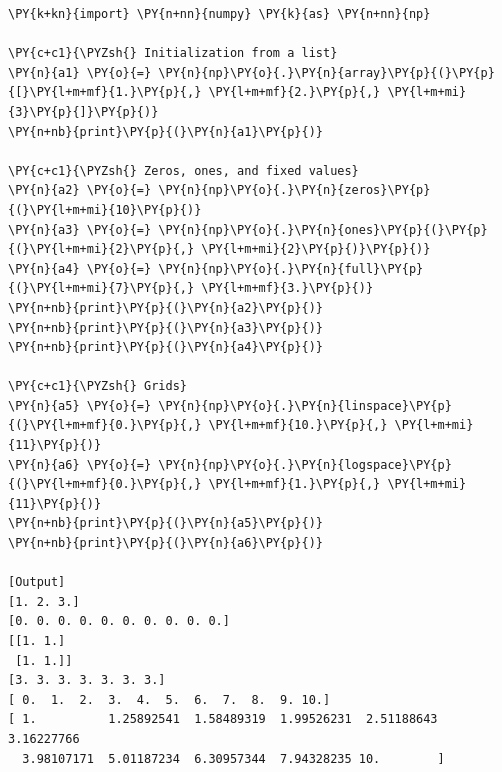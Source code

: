 \begin{Verbatim}[label=\makebox{\url{https://github.com/lucabaldini/cmepda/tree/master/slides/latex/snippets/numpy\_arrays.py}},commandchars=\\\{\}]
\PY{k+kn}{import} \PY{n+nn}{numpy} \PY{k}{as} \PY{n+nn}{np}

\PY{c+c1}{\PYZsh{} Initialization from a list}
\PY{n}{a1} \PY{o}{=} \PY{n}{np}\PY{o}{.}\PY{n}{array}\PY{p}{(}\PY{p}{[}\PY{l+m+mf}{1.}\PY{p}{,} \PY{l+m+mf}{2.}\PY{p}{,} \PY{l+m+mi}{3}\PY{p}{]}\PY{p}{)}
\PY{n+nb}{print}\PY{p}{(}\PY{n}{a1}\PY{p}{)}

\PY{c+c1}{\PYZsh{} Zeros, ones, and fixed values}
\PY{n}{a2} \PY{o}{=} \PY{n}{np}\PY{o}{.}\PY{n}{zeros}\PY{p}{(}\PY{l+m+mi}{10}\PY{p}{)}
\PY{n}{a3} \PY{o}{=} \PY{n}{np}\PY{o}{.}\PY{n}{ones}\PY{p}{(}\PY{p}{(}\PY{l+m+mi}{2}\PY{p}{,} \PY{l+m+mi}{2}\PY{p}{)}\PY{p}{)}
\PY{n}{a4} \PY{o}{=} \PY{n}{np}\PY{o}{.}\PY{n}{full}\PY{p}{(}\PY{l+m+mi}{7}\PY{p}{,} \PY{l+m+mf}{3.}\PY{p}{)}
\PY{n+nb}{print}\PY{p}{(}\PY{n}{a2}\PY{p}{)}
\PY{n+nb}{print}\PY{p}{(}\PY{n}{a3}\PY{p}{)}
\PY{n+nb}{print}\PY{p}{(}\PY{n}{a4}\PY{p}{)}

\PY{c+c1}{\PYZsh{} Grids}
\PY{n}{a5} \PY{o}{=} \PY{n}{np}\PY{o}{.}\PY{n}{linspace}\PY{p}{(}\PY{l+m+mf}{0.}\PY{p}{,} \PY{l+m+mf}{10.}\PY{p}{,} \PY{l+m+mi}{11}\PY{p}{)}
\PY{n}{a6} \PY{o}{=} \PY{n}{np}\PY{o}{.}\PY{n}{logspace}\PY{p}{(}\PY{l+m+mf}{0.}\PY{p}{,} \PY{l+m+mf}{1.}\PY{p}{,} \PY{l+m+mi}{11}\PY{p}{)}
\PY{n+nb}{print}\PY{p}{(}\PY{n}{a5}\PY{p}{)}
\PY{n+nb}{print}\PY{p}{(}\PY{n}{a6}\PY{p}{)}

[Output]
[1. 2. 3.]
[0. 0. 0. 0. 0. 0. 0. 0. 0. 0.]
[[1. 1.]
 [1. 1.]]
[3. 3. 3. 3. 3. 3. 3.]
[ 0.  1.  2.  3.  4.  5.  6.  7.  8.  9. 10.]
[ 1.          1.25892541  1.58489319  1.99526231  2.51188643  3.16227766
  3.98107171  5.01187234  6.30957344  7.94328235 10.        ]
\end{Verbatim}